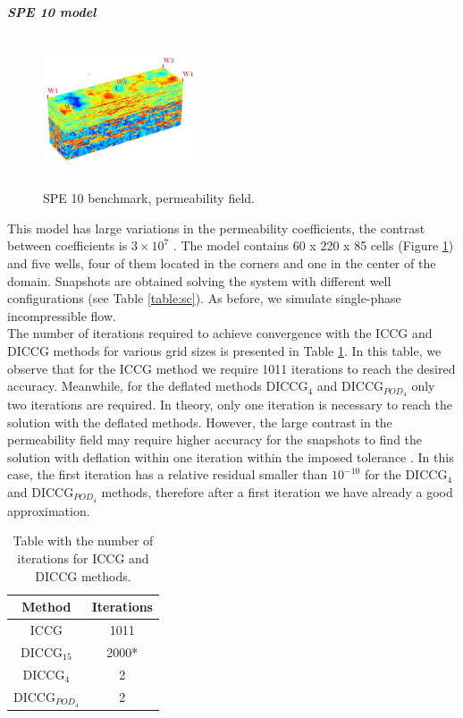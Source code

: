 \documentclass[review]{elsarticle}
\begin{document}
\emph{\textbf{SPE 10 model}}\\

\begin{figure}
\hspace{4mm}
 \centering
\includegraphics[width=4.5cm,height=4.5cm,keepaspectratio]
{images/perm85.jpg}
\caption{SPE 10 benchmark, permeability field.}
\label{fig:permcc}
\vspace{-10pt}

\end{figure}
This model has large variations in the permeability coefficients, the contrast between coefficients is $3\times 10^7$ \cite{Christie01}.
The model contains 60 x 220 x 85 cells (Figure \ref{fig:permcc}) and five wells, four of them located in the corners and one in the center of the domain.
Snapshots are obtained solving the system with different well
configurations (see Table \ref{table:sc}). As before, we simulate single-phase incompressible flow.\\
The number of iterations required to achieve convergence with the ICCG and DICCG methods for various grid sizes is presented in Table \ref{table:itgrid}. In this table, we observe that for the ICCG method we require 1011 iterations to reach the desired accuracy. Meanwhile, for the deflated methods DICCG$_4$ and DICCG$_{POD_4}$ only two iterations are required. In theory, only one iteration is necessary to reach the solution with the deflated methods. However, the large contrast in the permeability field may require higher accuracy for the snapshots to find the solution with deflation within one iteration within the imposed tolerance \cite{Diaz16}. In this case, the first iteration has a relative residual smaller than $10^{-10}$ for the DICCG$_4$ and DICCG$_{POD_4}$ methods, therefore after a first iteration we have already a good approximation.
\begin{table}[h!]
\centering
\begin{minipage}{.6\textwidth}
\centering
\begin{tabular}{|c | c| } 
 \hline
Method  &Iterations\\
   \hline
  ICCG &1011 \\ 
   DICCG$_{15}$ &  2000*\\ 
   DICCG$_{4}$ &  2\\  
   DICCG$_{POD_4}$  &2\\ 
\hline
\end{tabular}
\caption{Table with the number of iterations for ICCG and DICCG methods.}\label{table:itgrid}\end{minipage} 
\end{table}
\end{document}
